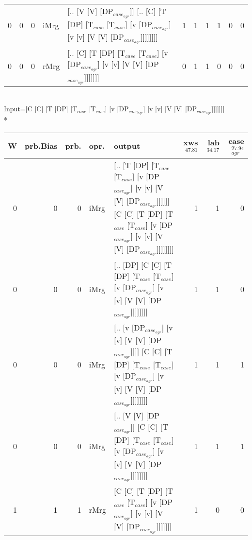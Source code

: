 \begin{tabularx}{\linewidth}{rrrlXrrrrrr}
   0 &       0 &   0 & iMrg & [.. [V [V] [DP$_{case_{agr}}$]] [.. [C] [T [DP] [T$_{case}$ [T$_{case}$] [v [DP$_{case_{agr}}$] [v [v] [V [V] [DP$_{case_{agr}}$]]]]]]]]                                                      &            1 &             1 &             1 &                  1 &              0 &              0 \\
   0 &       0 &   0 & rMrg & [.. [C] [T [DP] [T$_{case}$ [T$_{case}$] [v [DP$_{case_{agr}}$] [v [v] [V [V] [DP$_{case_{agr}}$]]]]]]]                                                                                 &            0 &             1 &             1 &                  0 &              0 &              0 \\
\hline
\end{tabularx}\endgroup\\
\begingroup\scriptsize Input=[C [C] [T [DP] [T$_{case}$ [T$_{case}$] [v [DP$_{case_{agr}}$] [v [v] [V [V] [DP$_{case_{agr}}$]]]]]]]\\*
\begin{tabularx}{\linewidth}{rrrlXrrr}
\hline
   W &   prb.Bias &   prb. & opr.   & output                                                                                                                                                             &   xws$^{47.81}$ &   lab$^{34.17}$ &   case$_{agr}^{27.94}$ \\
\hline
   0 &       0 &   0 & iMrg & [.. [T [DP] [T$_{case}$ [T$_{case}$] [v [DP$_{case_{agr}}$] [v [v] [V [V] [DP$_{case_{agr}}$]]]]]] [C [C] [T [DP] [T$_{case}$ [T$_{case}$] [v [DP$_{case_{agr}}$] [v [v] [V [V] [DP$_{case_{agr}}$]]]]]]]] &             1 &             1 &                  0 \\
   0 &       0 &   0 & iMrg & [.. [DP] [C [C] [T [DP] [T$_{case}$ [T$_{case}$] [v [DP$_{case_{agr}}$] [v [v] [V [V] [DP$_{case_{agr}}$]]]]]]]]                                                                       &             1 &             1 &                  0 \\
   0 &       0 &   0 & iMrg & [.. [v [DP$_{case_{agr}}$] [v [v] [V [V] [DP$_{case_{agr}}$]]]] [C [C] [T [DP] [T$_{case}$ [T$_{case}$] [v [DP$_{case_{agr}}$] [v [v] [V [V] [DP$_{case_{agr}}$]]]]]]]]                            &             1 &             1 &                  1 \\
   0 &       0 &   0 & iMrg & [.. [V [V] [DP$_{case_{agr}}$]] [C [C] [T [DP] [T$_{case}$ [T$_{case}$] [v [DP$_{case_{agr}}$] [v [v] [V [V] [DP$_{case_{agr}}$]]]]]]]]                                                      &             1 &             1 &                  1 \\
   1 &       1 &   1 & rMrg & [C [C] [T [DP] [T$_{case}$ [T$_{case}$] [v [DP$_{case_{agr}}$] [v [v] [V [V] [DP$_{case_{agr}}$]]]]]]]                                                                                 &             1 &             0 &                  0 \\
\hline
\end{tabularx}\endgroup\\
